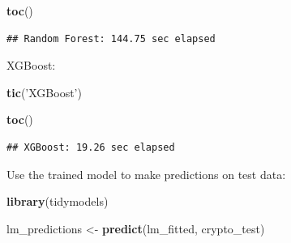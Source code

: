 \documentclass[
]{book}
\newenvironment{Shaded}{\begin{snugshade}}{\end{snugshade}}
\newcommand{\DataTypeTok}[1]{\textcolor[rgb]{0.13,0.29,0.53}{#1}}
\newcommand{\KeywordTok}[1]{\textcolor[rgb]{0.13,0.29,0.53}{\textbf{#1}}}
\newcommand{\NormalTok}[1]{#1}
\newcommand{\OperatorTok}[1]{\textcolor[rgb]{0.81,0.36,0.00}{\textbf{#1}}}
\newcommand{\StringTok}[1]{\textcolor[rgb]{0.31,0.60,0.02}{#1}}
\begin{document}
\begin{Shaded}
\begin{Highlighting}[]
\KeywordTok{toc}\NormalTok{()}
\end{Highlighting}
\end{Shaded}

\begin{verbatim}
## Random Forest: 144.75 sec elapsed
\end{verbatim}

XGBoost:

\begin{Shaded}
\begin{Highlighting}[]
\KeywordTok{tic}\NormalTok{(}\StringTok{'XGBoost'}\NormalTok{)}
\end{Highlighting}
\end{Shaded}

\begin{Shaded}
\end{Shaded}

\begin{Shaded}
\begin{Highlighting}[]
\KeywordTok{toc}\NormalTok{()}
\end{Highlighting}
\end{Shaded}

\begin{verbatim}
## XGBoost: 19.26 sec elapsed
\end{verbatim}

Use the trained model to make predictions on test data:

\begin{Shaded}
\begin{Highlighting}[]
\KeywordTok{library}\NormalTok{(tidymodels)}
\end{Highlighting}
\end{Shaded}

\begin{Shaded}
\begin{Highlighting}[]
\NormalTok{lm_predictions <-}\StringTok{ }\KeywordTok{predict}\NormalTok{(lm_fitted, crypto_test)}
\end{Highlighting}
\end{Shaded}
\end{document}
